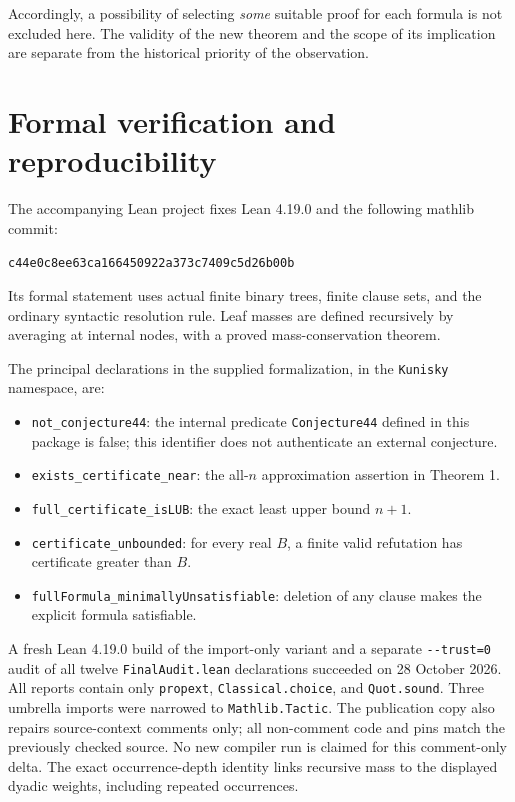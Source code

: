 \documentclass[11pt]{article}
\begin{document}
Accordingly, a possibility of selecting \emph{some} suitable proof for each formula is not excluded here. The validity of the new theorem and the scope of its implication are separate from the historical priority of the observation.

\clearpage
\section{Formal verification and reproducibility}\label{sec:formal}
The accompanying Lean project fixes Lean 4.19.0 and the following mathlib commit:
\begin{center}\small\texttt{c44e0c8ee63ca166450922a373c7409c5d26b00b}\end{center}
Its formal statement uses actual finite binary trees, finite clause sets, and the ordinary syntactic resolution rule. Leaf masses are defined recursively by averaging at internal nodes, with a proved mass-conservation theorem.

The principal declarations in the supplied formalization, in the \texttt{Kunisky} namespace, are:
\begin{itemize}[nosep]
\item \texttt{not\_conjecture44}: the internal predicate \texttt{Conjecture44} defined in this package is false; this identifier does not authenticate an external conjecture.
\item \texttt{exists\_certificate\_near}: the all-$n$ approximation assertion in Theorem 1.
\item \texttt{full\_certificate\_isLUB}: the exact least upper bound $n+1$.
\item \texttt{certificate\_unbounded}: for every real $B$, a finite valid refutation has certificate greater than $B$.
\item \texttt{fullFormula\_minimallyUnsatisfiable}: deletion of any clause makes the explicit formula satisfiable.
\end{itemize}
A fresh Lean 4.19.0 build of the import-only variant and a separate \texttt{-{}-trust=0} audit of all twelve \texttt{FinalAudit.lean} declarations succeeded on 28 October 2026. All reports contain only \texttt{propext}, \texttt{Classical.choice}, and \texttt{Quot.sound}. Three umbrella imports were narrowed to \texttt{Mathlib.Tactic}. The publication copy also repairs source-context comments only; all non-comment code and pins match the previously checked source. No new compiler run is claimed for this comment-only delta. The exact occurrence-depth identity links recursive mass to the displayed dyadic weights, including repeated occurrences.
\end{document}
